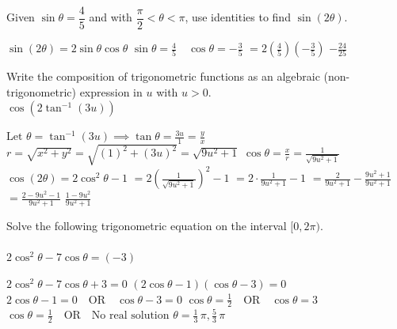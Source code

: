 \documentclass[11pt]{exam}
\newcommand{\version}{SP26A}
\begin{document}
\begin{questions}
\nocalc{\version}

\question[3]
Given \(\sin \theta = \dfrac{4}{5}\) and with \(\dfrac{\pi}{2} < \theta < \pi\), use identities to find \(\sin(2\theta)\).\\
\begin{solution}
    \(\sin(2\theta) = 2\sin\theta\cos\theta\)
    \(\sin\theta = \frac{4}{5} \quad \cos\theta = -\frac{3}{5}\)
    \(= 2 \left(\frac{4}{5}\right) \left(-\frac{3}{5}\right)\)
    \(\boxed{-\frac{24}{25}}\)
\end{solution}
    \answerline

\question[3]
Write the composition of trigonometric functions as an algebraic (non-trigonometric) expression in \(u\) with \(u > 0\).\\

\(\cos\left(2\tan^{-1}\left(3u\right)\right)\)
    \begin{solution}
        \(\text{Let } \theta = \tan^{-1}\left(3u\right) \implies \tan\theta = \frac{3u}{1} = \frac{y}{x}\)
        \(r = \sqrt{x^2 + y^2} = \sqrt{(1)^2 + (3u)^2} = \sqrt{9u^2 + 1}\)
        \(\cos\theta = \frac{x}{r} = \frac{1}{\sqrt{9u^2 + 1}}\)
        \(\cos(2\theta) = 2\cos^2\theta - 1\)
        \(= 2\left(\frac{1}{\sqrt{9u^2 + 1}}\right)^2 - 1\)
        \(= 2 \cdot \frac{1}{9u^2 + 1} - 1\)
        \(= \frac{2}{9u^2 + 1} - \frac{9u^2 + 1}{9u^2 + 1}\)
        \(= \frac{2 - 9u^2 - 1}{9u^2 + 1}\)
        \(\boxed{\frac{1 - 9u^2}{9u^2 + 1}}\)
    \end{solution}
    \answerline

\nocalc{\version}

\question[3]
Solve the following trigonometric equation on the interval \([0, 2\pi)\).\\ \\
\(2\cos^2 \theta - 7\cos \theta = (-3)\)
    \begin{solution}
        \(2\cos^2 \theta - 7\cos \theta + 3 = 0\)
        \((2\cos \theta - 1)(\cos \theta - 3) = 0\)
        \(2\cos \theta - 1 = 0 \quad \text{OR} \quad \cos \theta - 3 = 0\)
        \(\cos \theta = \frac{1}{2} \quad \text{OR} \quad \cos \theta = 3\)
        \(\cos \theta = \frac{1}{2} \quad \text{OR} \quad \text{No real solution}\)
        \(\boxed{\theta = \frac{1}{3} \, \pi, \frac{5}{3} \, \pi}\)
    \end{solution}
    \answerline


\end{questions}
\end{document}

